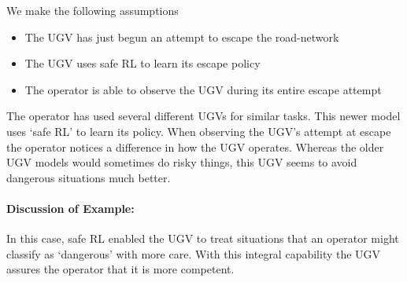 We make the following assumptions

\begin{itemize}
    \item The UGV has just begun an attempt to escape the road-network
    \item The UGV uses safe RL to learn its escape policy
    \item The operator is able to observe the UGV during its entire escape attempt
\end{itemize}

The operator has used several different UGVs for similar tasks. This newer model uses `safe RL' to learn its policy. When observing the UGV's attempt at escape the operator notices a difference in how the UGV operates. Whereas the older UGV models would sometimes do risky things, this UGV seems to avoid dangerous situations much better. 

\paragraph{\textbf{Discussion of Example:}} In this case, safe RL enabled the UGV to treat situations that an operator might classify as `dangerous' with more care. With this integral capability the UGV assures the operator that it is more competent.
